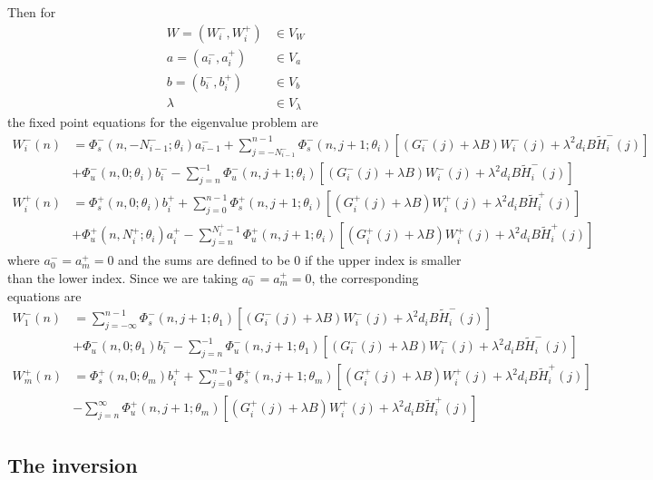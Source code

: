 \documentclass[12pt]{article}
\begin{document}
Then for
\begin{align*}
W = (W_i^-, W_i^+) &\in V_W \\
a = (a_i^-, a_i^+) &\in V_a \\
b = (b_i^-, b_i^+) &\in V_b \\
\lambda &\in V_\lambda
\end{align*}
the fixed point equations for the eigenvalue problem are
\begin{equation}\label{fpeig}
\begin{aligned}
W_i^-(n) &= 
\Phi_s^-(n, -N_{i-1}^-; \theta_i) a_{i-1}^- + \sum_{j = -N_{i-1}^-}^{n-1} \Phi_s^-(n, j+1; \theta_i)
[(G_i^-(j) + \lambda B) W_i^-(j) + \lambda^2 d_i B \tilde{H}_i^-(j)]
 \\
&+ \Phi_u^-(n, 0; \theta_i) b_i^- - \sum_{j = n}^{-1} \Phi_u^-(n, j+1; \theta_i) 
[(G_i^-(j) + \lambda B) W_i^-(j) + \lambda^2 d_i B \tilde{H}_i^-(j)] \\
W_i^+(n) &= \Phi_s^+(n, 0; \theta_i) b_i^+ + \sum_{j = 0}^{n-1} \Phi_s^+(n, j+1; \theta_i) 
[(G_i^+(j) + \lambda B) W_i^+(j) + \lambda^2 d_i B \tilde{H}_i^+(j)] \\
&+ \Phi_u^+(n, N_i^+; \theta_i) a_i^+ - \sum_{j = n}^{N_i^+-1} \Phi_u^+(n, j+1; \theta_i) 
[(G_i^+(j) + \lambda B) W_i^+(j) + \lambda^2 d_i B \tilde{H}_i^+(j)]
\end{aligned}
\end{equation}
where $a_0^- = a_m^+ = 0$ and the sums are defined to be $0$ if the upper index is smaller than the lower index. Since we are taking $a_0^- = a_m^+ = 0$, the corresponding equations are
\begin{align*}
W_1^-(n) &= \sum_{j = -\infty}^{n-1} \Phi_s^-(n, j+1; \theta_1)
[(G_i^-(j) + \lambda B) W_i^-(j) + \lambda^2 d_i B \tilde{H}_i^-(j)]
 \\
&+ \Phi_u^-(n, 0; \theta_1) b_i^- - \sum_{j = n}^{-1} \Phi_u^-(n, j+1; \theta_1) 
[(G_i^-(j) + \lambda B) W_i^-(j) + \lambda^2 d_i B \tilde{H}_i^-(j)] \\
W_m^+(n) &= \Phi_s^+(n, 0; \theta_m) b_i^+ + \sum_{j = 0}^{n-1} \Phi_s^+(n, j+1; \theta_m) 
[(G_i^+(j) + \lambda B) W_i^+(j) + \lambda^2 d_i B \tilde{H}_i^+(j)] \\
&- \sum_{j = n}^{\infty} \Phi_u^+(n, j+1; \theta_m) 
[(G_i^+(j) + \lambda B) W_i^+(j) + \lambda^2 d_i B \tilde{H}_i^+(j)]
\end{align*}

\subsection{The inversion}
\end{document}
